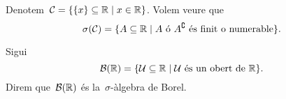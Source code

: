 \documentclass[../Apunts.tex]{subfiles}
\begin{document}
	\begin{example}
		\label{ex:sigma àlgebra de singletons}
		Denotem~\(\mathcal{C}=\{\{x\}\subseteq\mathbb{R}\mid x\in\mathbb{R}\}\). Volem veure que
		\[\sigma(\mathcal{C})=\{A\subseteq\mathbb{R}\mid A\text{ ó }A^{\complement}\text{ és finit o numerable}\}.\]
		\begin{solution}
		\end{solution}
	\end{example}
	\begin{definition}
		\label{def:sigma àlgebra de Borel}
		Sigui
		\[\mathcal{B}(\mathbb{R})=\{\mathcal{U}\subseteq\mathbb{R}\mid\mathcal{U}\text{ és un obert de }\mathbb{R}\}.\]
		Direm que~\(\mathcal{B}(\mathbb{R})\) és la~\(\sigma\)-àlgebra de Borel.
	\end{definition}
\end{document}
